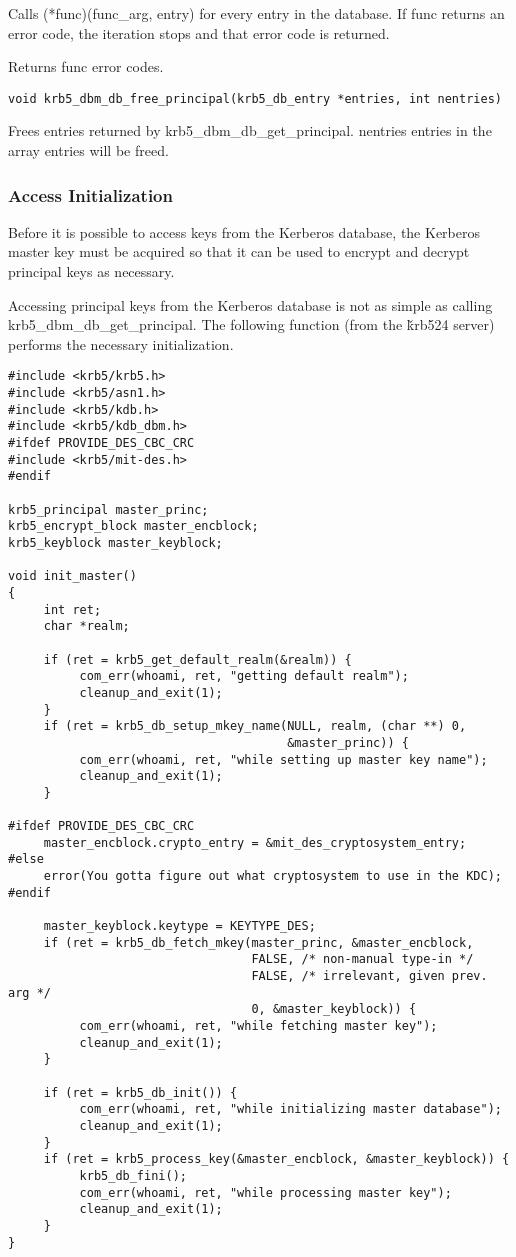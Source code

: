 Calls (*func)(func_arg, entry) for every entry in the database.  If
func returns an error code, the iteration stops and that error code is
returned.

Returns func error codes.

\begin{verbatim}
void krb5_dbm_db_free_principal(krb5_db_entry *entries, int nentries)
\end{verbatim}

Frees entries returned by krb5_dbm_db_get_principal.  nentries entries
in the array entries will be freed.

\subsubsection{Access Initialization}

Before it is possible to access keys from the Kerberos database, the
Kerberos master key must be acquired so that it can be used to encrypt
and decrypt principal keys as necessary.

Accessing principal keys from the Kerberos database is not as simple
as calling krb5_dbm_db_get_principal.  The following function (from
the \v{krb524} server) performs the necessary initialization.

\begin{verbatim}
#include <krb5/krb5.h>
#include <krb5/asn1.h>
#include <krb5/kdb.h>
#include <krb5/kdb_dbm.h>
#ifdef PROVIDE_DES_CBC_CRC
#include <krb5/mit-des.h>
#endif

krb5_principal master_princ;
krb5_encrypt_block master_encblock;
krb5_keyblock master_keyblock;

void init_master()
{
     int ret;
     char *realm;
     
     if (ret = krb5_get_default_realm(&realm)) {
          com_err(whoami, ret, "getting default realm");
          cleanup_and_exit(1);
     }
     if (ret = krb5_db_setup_mkey_name(NULL, realm, (char **) 0,
                                       &master_princ)) {
          com_err(whoami, ret, "while setting up master key name");
          cleanup_and_exit(1);
     }

#ifdef PROVIDE_DES_CBC_CRC
     master_encblock.crypto_entry = &mit_des_cryptosystem_entry;
#else
     error(You gotta figure out what cryptosystem to use in the KDC);
#endif

     master_keyblock.keytype = KEYTYPE_DES;
     if (ret = krb5_db_fetch_mkey(master_princ, &master_encblock,
                                  FALSE, /* non-manual type-in */
                                  FALSE, /* irrelevant, given prev. arg */
                                  0, &master_keyblock)) {
          com_err(whoami, ret, "while fetching master key");
          cleanup_and_exit(1);
     }

     if (ret = krb5_db_init()) {
          com_err(whoami, ret, "while initializing master database");
          cleanup_and_exit(1);
     }
     if (ret = krb5_process_key(&master_encblock, &master_keyblock)) {
          krb5_db_fini();
          com_err(whoami, ret, "while processing master key");
          cleanup_and_exit(1);
     }
}
\end{verbatim}

